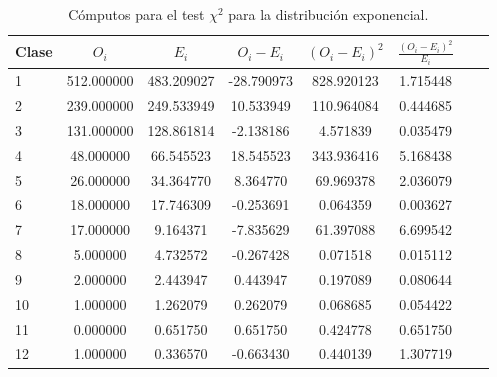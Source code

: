 \documentclass[a4paper,10pt]{article}
\begin{document}
\begin{table}[ht]
\begin{center}
\begin{tabular}{l*{6}{c}r}
\hline
Clase& $O_i$ & $E_i$  & $O_i - E_i$ & $(O_i - E_i)^2$ & $\frac{(O_i - E_i)^2}{E_i}$\\
\hline
1&512.000000&483.209027&-28.790973&828.920123&1.715448\\
2&239.000000&249.533949&10.533949&110.964084&0.444685\\
3&131.000000&128.861814&-2.138186&4.571839&0.035479\\
4&48.000000&66.545523&18.545523&343.936416&5.168438\\
5&26.000000&34.364770&8.364770&69.969378&2.036079\\
6&18.000000&17.746309&-0.253691&0.064359&0.003627\\
7&17.000000&9.164371&-7.835629&61.397088&6.699542\\
8&5.000000&4.732572&-0.267428&0.071518&0.015112\\
9&2.000000&2.443947&0.443947&0.197089&0.080644\\
10&1.000000&1.262079&0.262079&0.068685&0.054422\\
11&0.000000&0.651750&0.651750&0.424778&0.651750\\
12&1.000000&0.336570&-0.663430&0.440139&1.307719\\
\hline
\end{tabular}
\caption{\label{tab:chi_table} Cómputos para el test $\chi^2$ para la distribución exponencial.}
\end{center}
\end{table}
\end{document}
